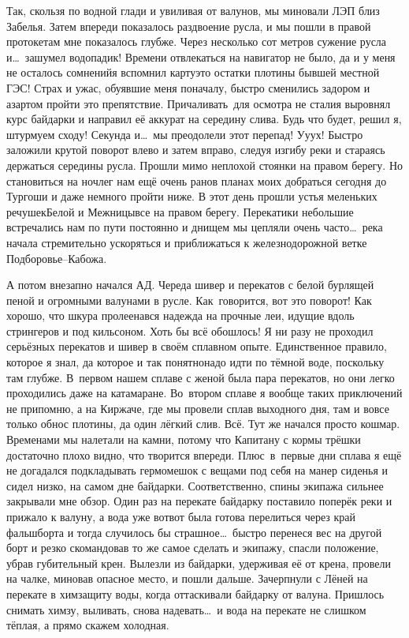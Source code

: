 Так, скользя по водной глади и увиливая от валунов, мы миновали ЛЭП близ Забелья. Затем впереди показалось раздвоение русла, и мы пошли в правой протоке\mdash там мне показалось глубже. Через несколько сот метров сужение русла и\ldots~зашумел водопадик! Времени отвлекаться на навигатор не было, да и у меня не осталось сомнений\mdash я вспомнил карту\mdash это остатки плотины бывшей местной ГЭС! Страх и ужас, обуявшие меня поначалу, быстро сменились задором и азартом пройти это препятствие. Причаливать~для осмотра не стали\mdash я выровнял курс байдарки и направил её аккурат на середину слива. Будь что будет, решил я, штурмуем сходу! Секунда и\ldots~мы преодолели этот перепад! У\sdash у\sdash ух! Быстро заложили крутой поворот влево и затем вправо, следуя изгибу реки и стараясь держаться середины русла. Прошли мимо неплохой стоянки на правом берегу. Но становиться на ночлег нам ещё очень рано\mdash в планах моих добраться сегодня до Тургоши и даже немного пройти ниже. В этот день прошли устья меленьких речушек\mdash Белой и Межницы\mdash все на правом берегу. Перекатики небольшие встречались нам по пути постоянно и днищем мы цепляли очень часто\ldots~река начала стремительно ускоряться и приближаться к железнодорожной ветке Подборовье\nobreakdash--Кабожа.

А потом внезапно начался АД. Череда шивер и перекатов с белой бурлящей пеной и огромными валунами в русле. Как~говорится, вот это поворот! Как хорошо, что шкура пролеена\mdash вся надежда на прочные леи, идущие вдоль стрингеров и под кильсоном. Хоть бы всё обошлось! Я ни разу не проходил серьёзных перекатов и шивер в своём сплавном опыте. Единственное правило, которое я знал, да которое и так понятно\mdash надо идти по тёмной воде, поскольку там глубже. В~первом нашем сплаве с женой была пара перекатов, но они легко проходились даже на катамаране. Во~втором сплаве я вообще таких приключений не припомню, а на Киржаче, где мы провели сплав выходного дня, там и вовсе только обнос плотины, да один лёгкий слив. Всё. Тут же начался просто кошмар. Временами мы налетали на камни, потому что Капитану с кормы трёшки достаточно плохо видно, что творится впереди. Плюс~в~первые дни сплава я ещё не догадался подкладывать гермомешок с вещами под себя на манер сиденья и сидел низко, на самом дне байдарки. Соответственно, спины экипажа сильнее закрывали мне обзор. Один раз на перекате байдарку поставило поперёк реки и прижало к валуну, а вода уже вот\sdash вот была готова перелиться через край фальшборта и тогда случилось бы страшное\ldots~быстро перенеся вес на другой борт и резко скомандовав то же самое сделать и экипажу, спасли положение, убрав губительный крен. Вылезли из байдарки, удерживая её от крена, провели на чалке, миновав опасное место, и пошли дальше. Зачерпнули с Лёней на перекате в химзащиту воды, когда оттаскивали байдарку от валуна. Пришлось снимать химзу, выливать, снова надевать\ldots~и вода на перекате не слишком тёплая, а прямо скажем холодная. 

